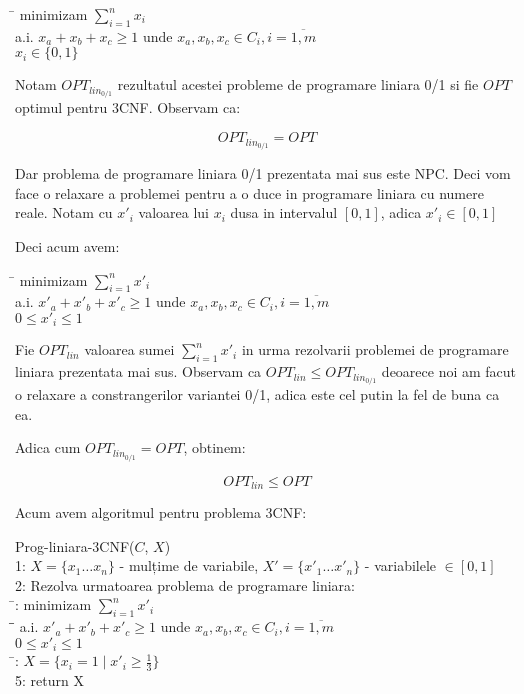 \documentclass[a4paper]{report}
\begin{document}
\begin{tabbing}
\hspace{2em}\= \kill 
minimizam $\sum_{i=1}^{n}x_{i}$ \\
a.i. \> $x_{a}+x_{b}+x_{c}\geq 1 \text{ unde } x_{a},x_{b},x_{c}\in C_{i}, i=\overline{1,m}$ \\
\> $x_{i}\in \{0, 1\}$
\end{tabbing}
Notam $OPT_{lin_{0/1}}$ rezultatul acestei probleme de programare liniara 0/1 si fie $OPT$ optimul pentru 3CNF. Observam ca:

\[OPT_{lin_{0/1}}=OPT\]

Dar problema de programare liniara 0/1 prezentata mai sus este NPC. Deci vom face o relaxare a problemei pentru a o duce in programare liniara cu numere reale. 
Notam cu $x'_{i}$ valoarea lui $x_{i}$ dusa in intervalul $[0,1]$, adica $x'_{i}\in [0,1]$

Deci acum avem:

\begin{tabbing}
\hspace{2em}\= \kill 
minimizam $\sum_{i=1}^{n}x'_{i}$ \\
a.i. \> $x'_{a}+x'_{b}+x'_{c}\geq 1 \text{ unde } x_{a},x_{b},x_{c}\in C_{i}, i=\overline{1,m}$ \\
\> $0\leq x'_{i}\leq 1$
\end{tabbing}

Fie $OPT_{lin}$ valoarea sumei $\sum_{i=1}^{n}x'_{i}$ in urma rezolvarii problemei de programare liniara prezentata mai sus.
Observam ca $OPT_{lin}\leq OPT_{lin_{0/1}}$ deoarece noi am facut o relaxare a constrangerilor variantei 0/1, adica este cel putin la fel de buna ca ea.

Adica cum $OPT_{lin_{0/1}}=OPT$, obtinem:

\[OPT_{lin}\leq OPT\]

Acum avem algoritmul pentru problema 3CNF:

\begin{tabbing}
Prog-liniara-3CNF($C$, $X$)\\
1: $X=\{x_{1}\dots x_{n}\}$ - mulțime de variabile, $X'=\{x'_{1}\dots x'_{n}\}$ - variabilele $\in [0,1]$ \\ 
2: Rezolva urmatoarea problema de programare liniara:\\
\hspace{2em}\= : \> minimizam $\sum_{i=1}^{n}x'_{i}$ \\
\hspace{2em}\=\hspace{2em}\= \kill 
\> a.i. \> $x'_{a}+x'_{b}+x'_{c}\geq 1 \text{ unde } x_{a},x_{b},x_{c}\in C_{i}, i=\overline{1,m}$ \\
\> \> $0\leq x'_{i}\leq 1$\\
\hspace{2em}\=: $X=\{x_{i}=1 \mid x'_{i}\geq \frac{1}{3}\}$\\
5: return X
\end{tabbing}
\end{document}
